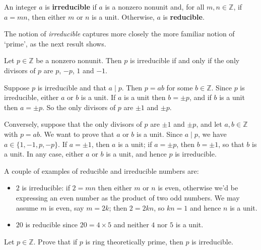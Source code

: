 \begin{definition}
\label{defReducible}
An integer $a$ is \textbf{irreducible} if $a$ is a nonzero nonunit and, for all $m,n \in \mathbb{Z}$, if $a=mn$, then either $m$ or $n$ is a unit. Otherwise, $a$ is \textbf{reducible}.
\end{definition}

The notion of \textit{irreducible} captures more closely the more familiar notion of `prime', as the next result shows.

\begin{proposition}
\label{propFactorsOfIrred}
Let $p \in \mathbb{Z}$ be a nonzero nonunit. Then $p$ is irreducible if and only if the only divisors of $p$ are $p$, $-p$, $1$ and $-1$.
\end{proposition}
\begin{cproof}
Suppose $p$ is irreducible and that $a \mid p$. Then $p = ab$ for some $b \in \mathbb{Z}$. Since $p$ is irreducible, either $a$ or $b$ is a unit. If $a$ is a unit then $b = \pm p$, and if $b$ is a unit then $a = \pm p$. So the only divisors of $p$ are $\pm 1$ and $\pm p$.

Conversely, suppose that the only divisors of $p$ are $\pm 1$ and $\pm p$, and let $a,b \in \mathbb{Z}$ with $p=ab$. We want to prove that $a$ or $b$ is a unit.
Since $a \mid p$, we have $a \in \{ 1, -1, p, -p \}$. If $a = \pm 1$, then $a$ is a unit; if $a=\pm p$, then $b = \pm 1$, so that $b$ is a unit. In any case, either $a$ or $b$ is a unit, and hence $p$ is irreducible.
\end{cproof}

\begin{example}
A couple of examples of reducible and irreducible numbers are:
\begin{itemize}
\item $2$ is irreducible: if $2=mn$ then either $m$ or $n$ is even, otherwise we'd be expressing an even number as the product of two odd numbers. We may assume $m$ is even, say $m=2k$; then $2=2kn$, so $kn=1$ and hence $n$ is a unit.
\item $20$ is reducible since $20 = 4 \times 5$ and neither $4$ nor $5$ is a unit.
\end{itemize}
\end{example}

\begin{exercise}
Let $p \in \mathbb{Z}$. Prove that if $p$ is ring theoretically prime, then $p$ is irreducible.
\end{exercise}

